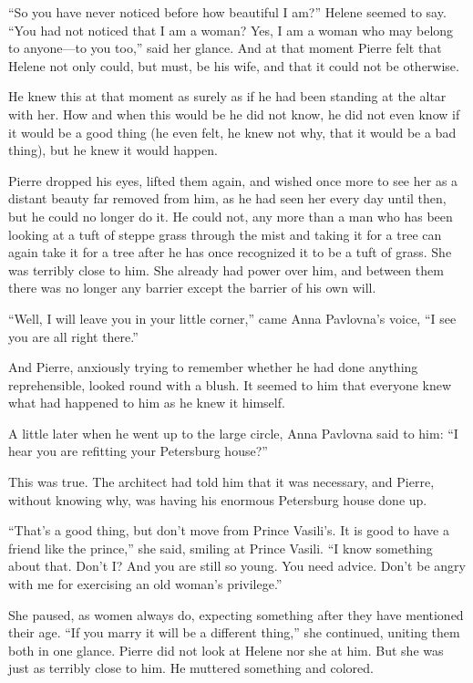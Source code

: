 ``So you have never noticed before how beautiful I am?'' Helene
seemed to say. ``You had not noticed that I am a woman? Yes, I am
a woman who may belong to anyone---to you too,'' said her
glance. And at that moment Pierre felt that Helene not only
could, but must, be his wife, and that it could not be otherwise.

He knew this at that moment as surely as if he had been standing
at the altar with her. How and when this would be he did not
know, he did not even know if it would be a good thing (he even
felt, he knew not why, that it would be a bad thing), but he knew
it would happen.

Pierre dropped his eyes, lifted them again, and wished once more
to see her as a distant beauty far removed from him, as he had
seen her every day until then, but he could no longer do it. He
could not, any more than a man who has been looking at a tuft of
steppe grass through the mist and taking it for a tree can again
take it for a tree after he has once recognized it to be a tuft
of grass. She was terribly close to him.  She already had power
over him, and between them there was no longer any barrier except
the barrier of his own will.

``Well, I will leave you in your little corner,'' came Anna
Pavlovna's voice, ``I see you are all right there.''

And Pierre, anxiously trying to remember whether he had done
anything reprehensible, looked round with a blush. It seemed to
him that everyone knew what had happened to him as he knew it
himself.

A little later when he went up to the large circle, Anna Pavlovna
said to him: ``I hear you are refitting your Petersburg house?''

This was true. The architect had told him that it was necessary,
and Pierre, without knowing why, was having his enormous
Petersburg house done up.

``That's a good thing, but don't move from Prince Vasili's. It is
good to have a friend like the prince,'' she said, smiling at
Prince Vasili. ``I know something about that. Don't I? And you
are still so young. You need advice. Don't be angry with me for
exercising an old woman's privilege.''

She paused, as women always do, expecting something after they
have mentioned their age. ``If you marry it will be a different
thing,'' she continued, uniting them both in one glance. Pierre
did not look at Helene nor she at him. But she was just as
terribly close to him. He muttered something and colored.

